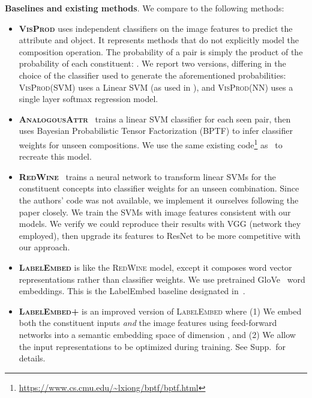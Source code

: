 \documentclass[runningheads]{llncs}
\newcommand{\SC}[1]{{\textsc{#1}}}
\begin{document}
\vspace{0.05in}
\noindent\textbf{Baselines and existing methods}. We compare to the following methods:
\begin{itemize}
\item \textbf{\SC{VisProd}} uses independent classifiers on the image features to predict the attribute and object.  It represents methods that do not explicitly model the composition operation. The probability of a pair is simply the product of the probability of each constituent: . We report two versions, differing in the choice of the classifier used to generate the aforementioned probabilities: \SC{VisProd(SVM)} uses a Linear SVM (as used in \cite{misra2017red}), and \SC{VisProd(NN)} uses a single layer softmax regression model. 

\item \textbf{\SC{AnalogousAttr}}~\cite{chen2014inferring} trains a linear SVM classifier for each seen pair, then uses Bayesian Probabilistic Tensor Factorization (BPTF) to infer classifier weights for unseen compositions. We use the same existing code\footnote{\url{https://www.cs.cmu.edu/~lxiong/bptf/bptf.html}} as~\cite{chen2014inferring} to recreate this model.

\item \textbf{\SC{RedWine}}~\cite{misra2017red} trains a neural network to transform linear SVMs for the constituent concepts into classifier weights for an unseen combination. Since the authors' code was not available, we implement it  ourselves following the paper closely.  We train the SVMs with image features consistent with our models. We verify we could reproduce their results with VGG (network they employed), then upgrade its features to ResNet to be more competitive with our approach. 

\item \textbf{\SC{LabelEmbed}} is like the \SC{RedWine} model, except it composes word vector representations rather than classifier weights. We use pretrained GloVe~\cite{pennington2014glove} word embeddings. This is the LabelEmbed baseline designated in~\cite{misra2017red}. 

\item \textbf{\SC{LabelEmbed+}} is an improved version of \SC{LabelEmbed} where (1) We embed both the constituent inputs \emph{and} the image features using feed-forward networks into a semantic embedding space of dimension , and (2) We allow the input representations to be optimized during training. See Supp.~for details.
\end{itemize} 
\end{document}
